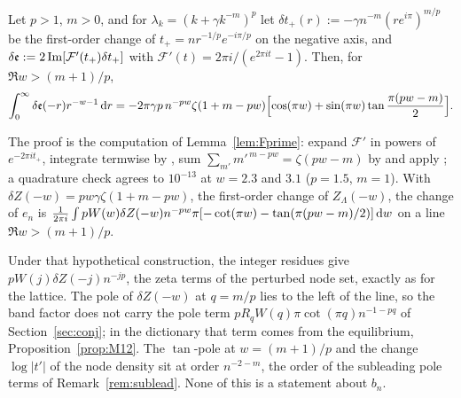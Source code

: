 \begin{proposition}\label{prop:pert}
Let $p>1$, $m>0$, and for $\lambda_k=(k+\gamma k^{-m})^p$ let $\delta t_+(r):=-\gamma n^{-m}(re^{i\pi})^{m/p}$ be the
first-order change of $t_+=nr^{-1/p}e^{-i\pi/p}$ on the negative axis, and
$\delta\mathfrak e:=2\operatorname{Im}[\mathcal F'(t_+)\delta t_+]$ with $\mathcal F'(t)=2\pi i/(e^{2\pi it}-1)$. Then, for $\Re w>(m+1)/p$,
\[
  \int_0^\infty\delta\mathfrak e(-r)r^{-w-1}\,\mathrm{d} r=-2\pi\gamma p\,n^{-pw}\zeta(1+m-pw)
  \Bigl[\cos(\pi w)+\sin(\pi w)\tan\frac{\pi(pw-m)}2\Bigr].
\]
\end{proposition}

The proof is the computation of Lemma~\ref{lem:Fprime}: expand $\mathcal F'$ in powers of $e^{-2\pi it_+}$, integrate termwise
by \cite[(5.9.1)]{DLMF}, sum $\sum_{m'}m'^{\,m-pw}=\zeta(pw-m)$ by \cite[(25.2.1)]{DLMF} and apply \cite[(25.4.1)]{DLMF}; a
quadrature check agrees to $10^{-13}$ at $w=2.3$ and $3.1$ ($p=1.5$, $m=1$). With $\delta Z(-w)=pw\gamma\zeta(1+m-pw)$, the
first-order change of $Z_\Lambda(-w)$, the change of $e_n$ is
$\frac1{2\pi i}\int pW(w)\delta Z(-w)n^{-pw}\pi[-\cot(\pi w)-\tan(\pi(pw-m)/2)]\,\mathrm{d} w$ on a line $\Re w>(m+1)/p$.

\begin{remark}\label{rem:pert}
Under that hypothetical construction, the integer residues give $pW(j)\delta Z(-j)n^{-jp}$, the zeta terms of the
perturbed node set, exactly as for the lattice. The pole of $\delta Z(-w)$ at $q=m/p$ lies to the left of the line, so
the band factor does not carry the pole term $pR_qW(q)\pi\cot(\pi q)n^{-1-pq}$ of Section~\ref{sec:conj}; in the
dictionary that term comes from the equilibrium, Proposition~\ref{prop:M12}. The $\tan$-pole at $w=(m+1)/p$ and the
change $\log|t'|$ of the node density sit at order $n^{-2-m}$, the order of the subleading pole terms of
Remark~\ref{rem:sublead}. None of this is a statement about $b_n$.
\end{remark}
